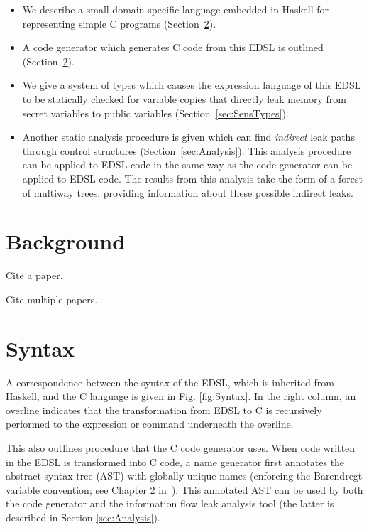 \documentclass[10pt, conference]{IEEEtran}
\begin{document}
\begin{itemize}
\item We describe a small domain specific language embedded in Haskell for representing
  simple C programs (Section~\ref{sec:Syntax}).
\item A code generator which generates C code from this EDSL is outlined
  (Section~\ref{sec:Syntax}).
\item We give a system of types which causes the expression language of this
  EDSL to be statically checked for variable copies that directly leak memory
  from secret variables to public variables (Section~\ref{sec:SensTypes}).
\item Another static analysis procedure is given which can find \textit{indirect}
  leak paths through control structures (Section~\ref{sec:Analysis}). This analysis
  procedure can be applied to EDSL code in the same way as the code generator
  can be applied to EDSL code. The results from this analysis take the form
  of a forest of multiway trees, providing information about these possible
  indirect leaks.
\end{itemize}

\section{Background}
Cite a paper. %

Cite multiple papers. %

\section{Syntax}
\label{sec:Syntax}
A correspondence between the syntax of the EDSL, which is inherited from
Haskell, and the C language is given in Fig. \ref{fig:Syntax}. In the right column, an
overline indicates that the transformation from EDSL to C is recursively
performed to the expression or command underneath the overline.

This also outlines procedure that the C code generator uses. When code written
in the EDSL is transformed into C code, a name generator first annotates the
abstract syntax tree (AST) with globally unique names (enforcing the Barendregt
variable convention; see Chapter 2 in~\cite{BarendregtConversion}). This annotated AST can be used by both the code generator and the
information flow leak analysis tool (the latter is described in Section
\ref{sec:Analysis}).
\end{document}
